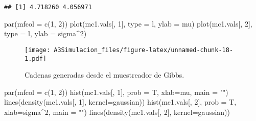 \documentclass[
  spanish,
]{book}
\newenvironment{Shaded}{\begin{snugshade}}{\end{snugshade}}
\newcommand{\AttributeTok}[1]{\textcolor[rgb]{0.77,0.63,0.00}{#1}}
\newcommand{\DecValTok}[1]{\textcolor[rgb]{0.00,0.00,0.81}{#1}}
\newcommand{\FunctionTok}[1]{\textcolor[rgb]{0.00,0.00,0.00}{#1}}
\newcommand{\NormalTok}[1]{#1}
\newcommand{\StringTok}[1]{\textcolor[rgb]{0.31,0.60,0.02}{#1}}
\theoremstyle{definition}
\theoremstyle{definition}
\theoremstyle{definition}
\theoremstyle{definition}
\theoremstyle{remark}
\begin{document}
\begin{verbatim}
## [1] 4.718260 4.056971
\end{verbatim}

\begin{Shaded}
\begin{Highlighting}[]
\FunctionTok{par}\NormalTok{(}\AttributeTok{mfcol =} \FunctionTok{c}\NormalTok{(}\DecValTok{1}\NormalTok{, }\DecValTok{2}\NormalTok{))}
\FunctionTok{plot}\NormalTok{(mc1.vals[, }\DecValTok{1}\NormalTok{], }\AttributeTok{type =} \StringTok{\textquotesingle{}l\textquotesingle{}}\NormalTok{, }\AttributeTok{ylab =} \StringTok{\textquotesingle{}mu\textquotesingle{}}\NormalTok{)}
\FunctionTok{plot}\NormalTok{(mc1.vals[, }\DecValTok{2}\NormalTok{], }\AttributeTok{type =} \StringTok{\textquotesingle{}l\textquotesingle{}}\NormalTok{, }\AttributeTok{ylab =} \StringTok{\textquotesingle{}sigma\^{}2\textquotesingle{}}\NormalTok{)}
\end{Highlighting}
\end{Shaded}

\begin{figure}
\centering
\texttt{[image: A3Simulacion\_files/figure-latex/unnamed-chunk-18-1.pdf]}
\caption{\label{fig:unnamed-chunk-18}Cadenas generadas desde el muestreador de Gibbs.}
\end{figure}

\begin{Shaded}
\begin{Highlighting}[]
\FunctionTok{par}\NormalTok{(}\AttributeTok{mfcol =} \FunctionTok{c}\NormalTok{(}\DecValTok{1}\NormalTok{, }\DecValTok{2}\NormalTok{))}
\FunctionTok{hist}\NormalTok{(mc1.vals[, }\DecValTok{1}\NormalTok{], }\AttributeTok{prob =}\NormalTok{ T, }\AttributeTok{xlab=}\StringTok{\textquotesingle{}mu\textquotesingle{}}\NormalTok{, }\AttributeTok{main =} \StringTok{""}\NormalTok{)}
\FunctionTok{lines}\NormalTok{(}\FunctionTok{density}\NormalTok{(mc1.vals[, }\DecValTok{1}\NormalTok{], }\AttributeTok{kernel=}\StringTok{\textquotesingle{}gaussian\textquotesingle{}}\NormalTok{))}
\FunctionTok{hist}\NormalTok{(mc1.vals[, }\DecValTok{2}\NormalTok{], }\AttributeTok{prob =}\NormalTok{ T, }\AttributeTok{xlab=}\StringTok{\textquotesingle{}sigma\^{}2\textquotesingle{}}\NormalTok{, }\AttributeTok{main =} \StringTok{""}\NormalTok{)}
\FunctionTok{lines}\NormalTok{(}\FunctionTok{density}\NormalTok{(mc1.vals[, }\DecValTok{2}\NormalTok{], }\AttributeTok{kernel=}\StringTok{\textquotesingle{}gaussian\textquotesingle{}}\NormalTok{))}
\end{Highlighting}
\end{Shaded}
\end{document}
